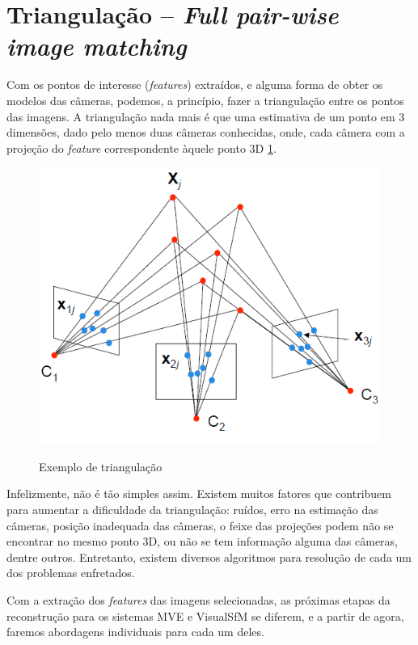 \section{Triangulação -- \emph{Full pair-wise image matching}}

Com os pontos de interesse (\emph{features}) extraídos, e alguma forma de
obter os modelos das câmeras, podemos, a princípio, fazer a
triangulação entre os pontos das imagens.  
A triangulação nada mais é que uma estimativa de um ponto em 3 dimensões, dado
pelo menos duas câmeras conhecidas, onde, cada câmera com a projeção do
\emph{feature} correspondente àquele ponto 3D \ref{fig:triangulacao}.

\begin{figure} [!h]
	\centering
	\caption{Exemplo de triangulação}
	\includegraphics[width=0.45\linewidth]{figs/triangulacao.png}
	\label{fig:triangulacao}
\end{figure}

Infelizmente, não é tão simples assim. Existem muitos fatores que contribuem
para aumentar a dificuldade da triangulação: ruídos, erro na estimação das
câmeras, posição inadequada das câmeras, o
feixe das projeções podem não se encontrar no mesmo ponto 3D, ou não se tem
informação alguma das câmeras, dentre outros. Entretanto, existem diversos algoritmos
para resolução de cada um dos problemas enfretados. 

Com a extração dos \emph{features} das imagens selecionadas, as próximas etapas
da reconstrução para os sistemas MVE e VisualSfM se diferem, e a partir de
agora, faremos abordagens individuais para cada um deles.



